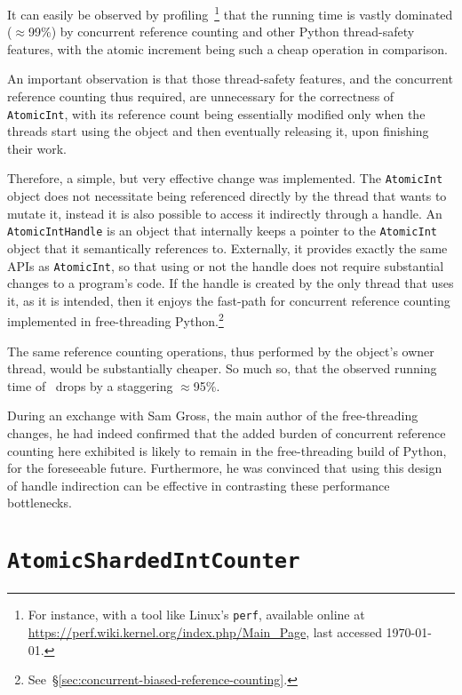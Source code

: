 It can easily be observed by profiling~\cite[examples/atomic\_int/counter.py]{cereggii}\footnote{%
    For instance, with a tool like Linux's \texttt{perf}, available online at \url{https://perf.wiki.kernel.org/index.php/Main_Page}, last accessed \today.
} that the running time is vastly dominated ($\approx$99\%) by concurrent reference counting and other Python thread-safety features, with the atomic increment being such a cheap operation in comparison.

An important observation is that those thread-safety features, and the concurrent reference counting thus required, are unnecessary for the correctness of \texttt{AtomicInt}, with its reference count being essentially modified only when the threads start using the object and then eventually releasing it, upon finishing their work.

Therefore, a simple, but very effective change was implemented.
The \texttt{AtomicInt} object does not necessitate being referenced directly by the thread that wants to mutate it, instead it is also possible to access it indirectly through a handle.
An \texttt{AtomicIntHandle} is an object that internally keeps a pointer to the \texttt{AtomicInt} object that it semantically references to.
Externally, it provides exactly the same APIs as \texttt{AtomicInt}, so that using or not the handle does not require substantial changes to a program's code.
If the handle is created by the only thread that uses it, as it is intended, then it enjoys the fast-path for concurrent reference counting implemented in free-threading Python.\footnote{%
    See~\S\ref{sec:concurrent-biased-reference-counting}.
}

The same reference counting operations, thus performed by the object's owner thread, would be substantially cheaper.
So much so, that the observed running time of~\cite[examples/atomic\_int/counter.py]{cereggii} drops by a staggering $\approx$95\%.

During an exchange with Sam Gross, the main author of the free-threading changes, he had indeed confirmed that the added burden of concurrent reference counting here exhibited is likely to remain in the free-threading build of Python, for the foreseeable future.
Furthermore, he was convinced that using this design of handle indirection can be effective in contrasting these performance bottlenecks.


\section{\texttt{AtomicShardedIntCounter}}\label{sec:atomicshardedintcounter}

